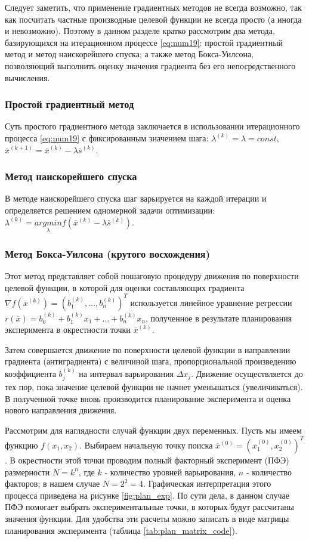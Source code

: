 \documentclass[a4paper,12pt]{report}
\begin{document}
Следует заметить, что применение градиентных методов не всегда возможно, так как посчитать частные производные целевой функции не всегда просто (а иногда и невозможно). Поэтому в данном разделе кратко рассмотрим два метода, базирующихся на итерационном процессе \eqref{eq:num19}: простой градиентный метод и метод наискорейшего спуска; а также метод Бокса-Уилсона, позволяющий выполнить оценку значения градиента без его непосредственного вычисления.

\subsubsection{Простой градиентный метод}
Суть простого градиентного метода заключается в использовании итерационного процесса \eqref{eq:num19} с фиксированным значением шага: $\lambda^{(k)} = \lambda = const$, $\overline{x}^{(k+1)} = \overline{x}^{(k)} - \lambda\overline{s}^{(k)}$.

\subsubsection{Метод наискорейшего спуска}
В методе наискорейшего спуска шаг варьируется на каждой итерации и определяется решением одномерной задачи оптимизации: $\lambda^{(k)} = \underset{\lambda}{argmin}f(\overline{x}^{(k)} - \lambda\overline{s}^{(k)})$.

\subsubsection{Метод Бокса-Уилсона (крутого восхождения)}
Этот метод представляет собой пошаговую процедуру движения по поверхности целевой функции, в которой для оценки составляющих градиента $\nabla f(\overline{x}^{(k)}) = \left(b^{(k)}_{1}, \ldots, b^{(k)}_{n}\right)^{T}$ используется линейное уравнение регрессии $r(\overline{x}) = b^{(k)}_{0} + b^{(k)}_{1}x_{1} + \ldots + b^{(k)}_{n}x_{n}$, полученное в результате планирования эксперимента в окрестности точки $\overline{x}^{(k)}$.

Затем совершается движение по поверхности целевой функции в направлении градиента (антиградиента) с величиной шага, пропорциональной  произведению коэффициента $b^{(k)}_{j}$ на интервал варьирования $\Delta x_{j}$. Движение осуществляется до тех пор, пока значение целевой функции не начнет уменьшаться (увеличиваться). В полученной точке вновь производится планирование эксперимента и оценка нового направления движения.

Рассмотрим для наглядности случай функции двух переменных. Пусть мы имеем функцию $f(x_{1}, x_{2})$. Выбираем начальную точку поиска $\overline{x}^{(0)} = (x^{(0)}_{1}, x^{(0)}_{2})^{T}$. В окрестности этой точки проводим полный факторный эксперимент (ПФЭ) размерности $N = k^{n}$, где $k$ - количество уровней варьирования, $n$ - количество факторов; в нашем случае $N = 2^{2} = 4$. Графическая интерпретация этого процесса приведена на рисунке \ref{fig:plan_exp}. По сути дела, в данном случае ПФЭ помогает выбрать экспериментальные точки, в которых будут рассчитаны значения функции. Для удобства эти расчеты можно записать в виде матрицы планирования эксперимента (таблица \ref{tab:plan_matrix_code}).
\end{document}

